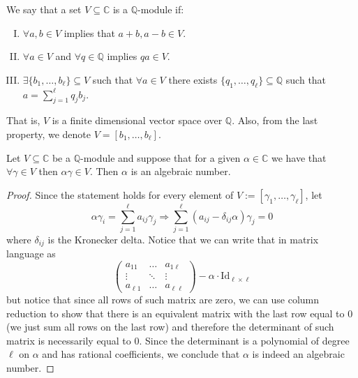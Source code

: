 \begin{definition}
   We say that a set \(V \subseteq \mathbb{C}\) is a \(\mathbb{Q}\)-module if:
   \begin{enumerate}[I.]
      \item  \(\forall a, b \in V\) implies that \(a + b, a - b \in V\).
      \item \(\forall a \in V\) and  \(\forall q \in \mathbb{Q}\) implies \(q a
         \in V\).
      \item \(\exists \{b_1, \dots, b_\ell\} \subseteq V\) such that \(\forall a
         \in V\) there exists \(\{q_1, \dots, q_\ell\} \subseteq \mathbb{Q}\) 
         such that \(a = \sum_{j=1}^{\ell} q_j b_j\).
   \end{enumerate}
   That is, \(V\) is a finite dimensional vector space over \(\mathbb{Q}\). Also,
   from the last property, we denote \(V = [b_1, \dots, b_\ell]\).
\end{definition}

\begin{proposition}
   Let \(V \subseteq \mathbb{C}\) be a \(\mathbb{Q}\)-module and suppose that
   for a given \(\alpha \in \mathbb{C}\) we have that \(\forall \gamma \in V\)
   then \(\alpha \gamma \in V\). Then \(\alpha\) is an algebraic number.
\end{proposition}

\begin{proof}
   Since the statement holds for every element of \(V := [\gamma_1, \dots,
   \gamma_\ell]\), let 
   \[
      \alpha\gamma_i = \sum_{j=1}^{\ell} a_{ij} \gamma_j 
      \Rightarrow 
      \sum_{j = 1}^\ell (a_{ij} - \delta_{ij}\alpha) \gamma_j = 0
   \]
   where \(\delta_{ij}\) is the Kronecker delta. Notice that we can write that
   in matrix language as
   \[
      \begin{pmatrix} 
         a_{11} & \dots & a_{1\ell} \\
         \vdots & \ddots & \vdots \\
         a_{\ell 1} & \dots & a_{\ell \ell}
      \end{pmatrix} 
      - \alpha \cdot \mathrm{Id}_{\ell \times \ell}
   \] 
   but notice that since all rows of such matrix are zero, we can use  column
   reduction to show that there is an equivalent matrix with the last row equal
   to \(0\) (we just sum all rows on the last row) and therefore the determinant
   of such matrix is necessarily equal to \(0\). Since the determinant is a
   polynomial of degree \(\ell\) on \(\alpha\) and has rational coefficients, we
   conclude that \(\alpha\) is indeed an algebraic number.
\end{proof}

